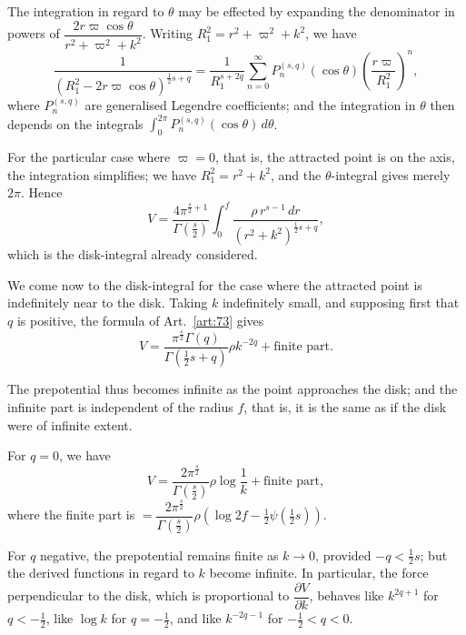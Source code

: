 \documentclass[11pt,a4paper]{book}
\begin{document}
\begin{art}\label{art:75}
The integration in regard to $\theta$ may be effected by expanding the denominator in powers of $\dfrac{2r\varpi\cos\theta}{r^2 + \varpi^2 + k^2}$. Writing $R_1^2 = r^2 + \varpi^2 + k^2$, we have
\[
\frac{1}{(R_1^2 - 2r\varpi\cos\theta)^{\frac{1}{2}s+q}} = \frac{1}{R_1^{s+2q}} \sum_{n=0}^\infty P_n^{(s,q)}(\cos\theta) \left(\frac{r\varpi}{R_1^2}\right)^n,
\]
where $P_n^{(s,q)}$ are generalised Legendre coefficients; and the integration in $\theta$ then depends on the integrals $\int_0^{2\pi} P_n^{(s,q)}(\cos\theta) \, d\theta$.
\end{art}

\begin{art}\label{art:76}
For the particular case where $\varpi = 0$, that is, the attracted point is on the axis, the integration simplifies; we have $R_1^2 = r^2 + k^2$, and the $\theta$-integral gives merely $2\pi$. Hence
\[
V = \frac{4\pi^{\frac{s}{2}+1}}{\Gamma(\frac{s}{2})} \int_0^f \frac{\rho \, r^{s-1} \, dr}{(r^2 + k^2)^{\frac{1}{2}s+q}},
\]
which is the disk-integral already considered.
\end{art}

\begin{art}\label{art:77}
We come now to the disk-integral for the case where the attracted point is indefinitely near to the disk. Taking $k$ indefinitely small, and supposing first that $q$ is positive, the formula of Art.~\ref{art:73} gives
\[
V = \frac{\pi^{\frac{s}{2}}\Gamma(q)}{\Gamma(\frac{1}{2}s+q)} \rho k^{-2q} + \text{finite part}.
\]

The prepotential thus becomes infinite as the point approaches the disk; and the infinite part is independent of the radius $f$, that is, it is the same as if the disk were of infinite extent.
\end{art}

\begin{art}\label{art:78}
For $q = 0$, we have
\[
V = \frac{2\pi^{\frac{s}{2}}}{\Gamma(\frac{s}{2})} \rho \log\frac{1}{k} + \text{finite part},
\]
where the finite part is $= \dfrac{2\pi^{\frac{s}{2}}}{\Gamma(\frac{s}{2})} \rho \left(\log 2f - \tfrac{1}{2}\psi(\tfrac{1}{2}s)\right)$.
\end{art}

\begin{art}\label{art:79}
For $q$ negative, the prepotential remains finite as $k \to 0$, provided $-q < \tfrac{1}{2}s$; but the derived functions in regard to $k$ become infinite. In particular, the force perpendicular to the disk, which is proportional to $\dfrac{\partial V}{\partial k}$, behaves like $k^{2q+1}$ for $q < -\tfrac{1}{2}$, like $\log k$ for $q = -\tfrac{1}{2}$, and like $k^{-2q-1}$ for $-\tfrac{1}{2} < q < 0$.
\end{art}
\end{document}
